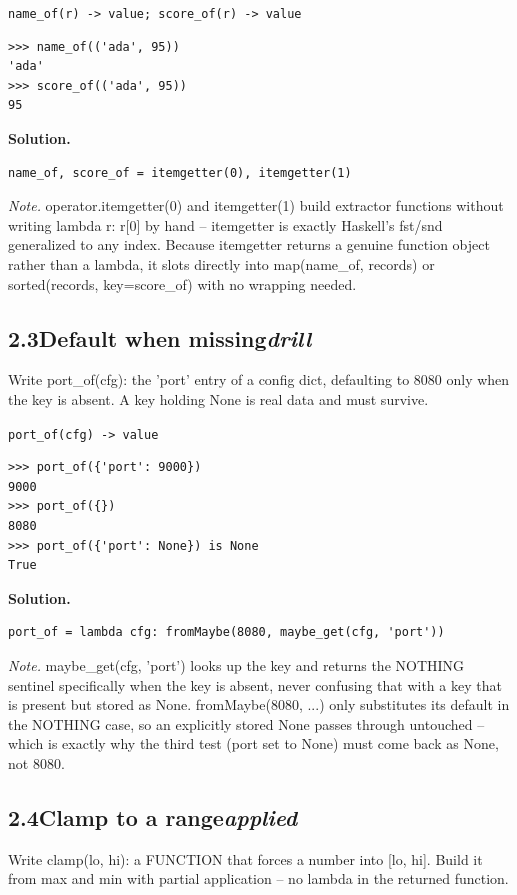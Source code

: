 \documentclass[10pt,letterpaper]{book}
\begin{document}
\noindent\texttt{name\_of(r) -> value; score\_of(r) -> value}
\begin{lstlisting}[style=ex]
>>> name_of(('ada', 95))
'ada'
>>> score_of(('ada', 95))
95
\end{lstlisting}
\noindent\textbf{Solution.}
\begin{lstlisting}[style=code]
name_of, score_of = itemgetter(0), itemgetter(1)
\end{lstlisting}
\noindent\textit{Note.} operator.itemgetter(0) and itemgetter(1) build extractor functions without writing lambda r: r[0] by hand -- itemgetter is exactly Haskell's fst/snd generalized to any index. Because itemgetter returns a genuine function object rather than a lambda, it slots directly into map(name\_of, records) or sorted(records, key=score\_of) with no wrapping needed.

\subsection*{2.3\quad Default when missing\hfill\textnormal{\textit{drill}}}
Write port\_of(cfg): the 'port' entry of a config dict, defaulting to 8080 only when the key is absent. A key holding None is real data and must survive.

\noindent\texttt{port\_of(cfg) -> value}
\begin{lstlisting}[style=ex]
>>> port_of({'port': 9000})
9000
>>> port_of({})
8080
>>> port_of({'port': None}) is None
True
\end{lstlisting}
\noindent\textbf{Solution.}
\begin{lstlisting}[style=code]
port_of = lambda cfg: fromMaybe(8080, maybe_get(cfg, 'port'))
\end{lstlisting}
\noindent\textit{Note.} maybe\_get(cfg, 'port') looks up the key and returns the NOTHING sentinel specifically when the key is absent, never confusing that with a key that is present but stored as None. fromMaybe(8080, ...) only substitutes its default in the NOTHING case, so an explicitly stored None passes through untouched -- which is exactly why the third test (port set to None) must come back as None, not 8080.

\subsection*{2.4\quad Clamp to a range\hfill\textnormal{\textit{applied}}}
Write clamp(lo, hi): a FUNCTION that forces a number into [lo, hi]. Build it from max and min with partial application -- no lambda in the returned function.
\end{document}
